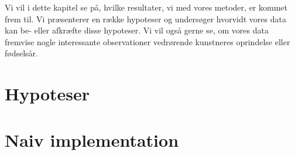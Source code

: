 {
{\sffamily Vi vil i dette kapitel se på, hvilke resultater, vi med vores
metoder, er kommet frem til. Vi præsenterer en række hypoteser og
undersøger hvorvidt vores data kan be- eller afkræfte disse hypoteser.
Vi vil også gerne se, om vores data fremvise nogle interessante
observationer vedrørende kunstneres oprindelse eller fødselsår.
}

\section{Hypoteser}


\section{Naiv implementation}


}
